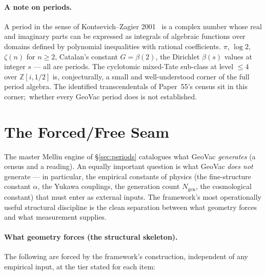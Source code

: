 \documentclass[11pt,a4paper]{article}
\newcommand{\Z}{\mathbb{Z}}
\begin{document}
\paragraph{A note on periods.}  A period in the sense of
Kontsevich--Zagier 2001~\cite{kontsevich_zagier2001} is a complex
number whose real and imaginary parts can be expressed as integrals of
algebraic functions over domains defined by polynomial inequalities
with rational coefficients.  $\pi$, $\log 2$, $\zeta(n)$ for $n \ge
2$, Catalan's constant $G = \beta(2)$, the Dirichlet $\beta(s)$ values
at integer $s$ --- all are periods.  The cyclotomic mixed-Tate
sub-class at level $\le 4$ over $\Z[i, 1/2]$ is, conjecturally, a
small and well-understood corner of the full period algebra.  The
identified transcendentals of Paper~55's census sit in this corner;\
whether every GeoVac period does is not established.

\section{The Forced/Free Seam}
\label{sec:forced_free}

The master Mellin engine of \S\ref{sec:periods} catalogues what GeoVac
\emph{generates} (a census and a reading).  An equally important question is what GeoVac
\emph{does not} generate --- in particular, the empirical constants of
physics (the fine-structure constant $\alpha$, the Yukawa couplings,
the generation count $N_{\mathrm{gen}}$, the cosmological constant)
that must enter as external inputs.  The framework's most operationally
useful structural discipline is the clean separation between what
geometry forces and what measurement supplies.

\paragraph{What geometry forces (the structural skeleton).}

The following are forced by the framework's construction,
independent of any empirical input, at the tier stated for each item:
\end{document}
